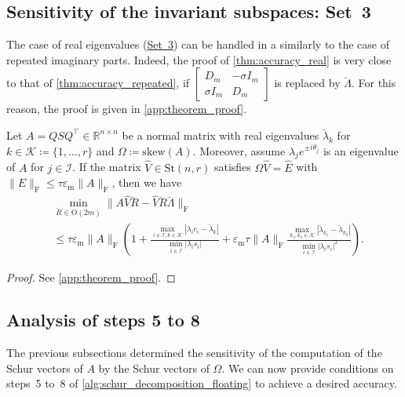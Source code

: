 \documentclass[10pt,twoside,dvipsnames]{siamart1116}
\numberwithin{algorithm}{section}
\numberwithin{equation}{section}
\newcommand{\wordref}[2]{\hyperlink{#1}{#2}}
\begin{document}
\subsection{Sensitivity of the invariant subspaces: Set~3} The case of real eigenvalues (\wordref{set3}{Set~3}) can be handled in a similarly to the case of repeated imaginary parts. Indeed, the proof of \cref{thm:accuracy_real} is very close to that of \cref{thm:accuracy_repeated}, if $\left[\begin{smallmatrix}
		D_m&-\sigma I_m\\
		\sigma I_m&D_m
		\end{smallmatrix}\right]$ is replaced by $\breve{\Lambda}$. For this reason, the proof is given in \cref{app:theorem_proof}.
\begin{theorem}\label{thm:accuracy_real}
Let $A=QSQ^\top \in\mathbb{R}^{n\times n}$ be a normal matrix with real eigenvalues $\breve{\lambda}_k$ for $k\in\mathcal{K}\coloneq\{1,...,r\}$ and $\Omega \coloneq \mathrm{skew}(A)$. Moreover, assume $\lambda_j e^{\pm i\theta_j}$ is an eigenvalue of $A$ for $j \in\mathcal{I}$. If the matrix $\widehat{V}\in\mathrm{St}(n,r)$ satisfies $\Omega\widehat{V}=\widehat{E}$ with $\|E\|_\mathrm{F}\leq\tau \varepsilon_\mathrm{m} \|A\|_\mathrm{F}$, then we have
\begin{align*}
	&\min_{\breve{R}\in\mathrm{O}(2m)}\|A\widehat{V}\breve{R}-\widehat{V}\breve{R}\breve{\Lambda}\|_\mathrm{F} \\&\leq \tau \varepsilon_\mathrm{m}\|A\|_\mathrm{F} \left(1+ \frac{\max\limits_{i\in\mathcal{I},k\in\mathcal{K}}|\lambda_i c_i-\breve{\lambda}_k|}{\min\limits_{i\in\mathcal{I}}|\lambda_i s_i|}+\varepsilon_\mathrm{m} \tau\|A\|_\mathrm{F}\frac{\max\limits_{k_1,k_2\in\mathcal{K}}|\breve{\lambda}_{k_1}-\breve{\lambda}_{k_2}|}{\min\limits_{i\in\mathcal{I}}|\lambda_i s_i|^2}\right).
\end{align*}
\end{theorem}
\begin{proof}
	See \cref{app:theorem_proof}.
\end{proof}
\subsection{Analysis of steps 5 to 8}\label{subsec:accuracy_cont}
	
	The previous subsections determined the sensitivity of the computation of the Schur vectors of $A$ by the Schur vectors of $\Omega$. We can now provide conditions on steps~5 to~8 of \cref{alg:schur_decomposition_floating} to achieve a desired accuracy.
	
\end{document}
